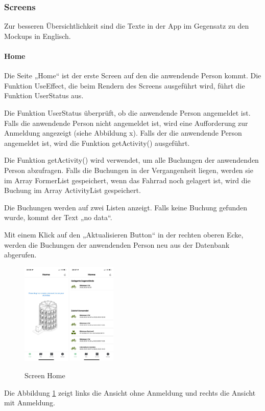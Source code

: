 \subsubsection{Screens}Zur besseren Übersichtlichkeit sind die Texte in der App im Gegensatz zu den Mockups in Englisch.

\paragraph{Home}Die Seite „Home“ ist der erste Screen auf den die anwendende Person kommt. Die Funktion UseEffect, die beim Rendern des Screens ausgeführt wird, führt die Funktion UserStatus aus.

\noindent Die Funktion UserStatus überprüft, ob die anwendende Person angemeldet ist. Falls die anwendende Person nicht angemeldet ist, wird eine Aufforderung zur Anmeldung angezeigt (siehe Abbildung x). Falls der die anwendende Person angemeldet ist, wird die Funktion getActivity() ausgeführt.

\noindent Die Funktion getActivity() wird verwendet, um alle Buchungen der anwendenden Person abzufragen. Falls die Buchungen in der Vergangenheit liegen, werden sie im \Gls{Array} FormerList gespeichert, wenn das Fahrrad noch gelagert ist, wird die Buchung im \Gls{Array} ActivityList gespeichert.

\noindent Die Buchungen werden auf zwei Listen anzeigt. Falls keine Buchung gefunden wurde, kommt der Text „no data“.

\noindent Mit einem Klick auf den „Aktualisieren Button“ in der rechten oberen Ecke, werden die Buchungen der anwendenden Person neu aus der Datenbank abgerufen.


\begin{figure}[H]
  \centering
  \includegraphics[width=0.2\textwidth]{images/app-screenshots/screenhomeno.png}
  \includegraphics[width=0.2\textwidth]{images/app-screenshots/screenhomeyes.png}
  \caption{Screen Home}
  \label{fig:screenhome}
\end{figure}
Die Abbildung \ref{fig:screenhome} zeigt links die Ansicht ohne Anmeldung und rechts die Ansicht mit Anmeldung.

